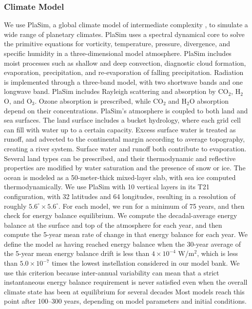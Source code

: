\documentclass[fleqn,usenatbib]{mnras}
\begin{document}
\subsubsection{Climate Model}
We use PlaSim, a global climate model of intermediate complexity \citep{Fraedrich2005}, to simulate a wide range of planetary climates. PlaSim uses a spectral dynamical core to solve the primitive equations for vorticity, temperature, pressure, divergence, and specific humidity in a three-dimensional model atmosphere. PlaSim includes moist processes such as shallow and deep convection, diagnostic cloud formation, evaporation, precipitation, and re-evaporation of falling precipitation. Radiation is implemented through a three-band model, with two shortwave bands and one longwave band. PlaSim includes Rayleigh scattering and absorption by CO$_2$, H$_2$O, and O$_3$. Ozone absorption is prescribed, while CO$_2$ and H$_2$O absorption depend on their concentrations. PlaSim's atmosphere is coupled to both land and sea surfaces. The land surface includes a bucket hydrology, where each grid cell can fill with water up to a certain capacity. Excess surface water is treated as runoff, and advected to the continental margin according to average topography, creating a river system. Surface water and runoff both contribute to evaporation. Several land types can be prescribed, and their thermodynamic and reflective properties are modified by water saturation and the presence of snow or ice. The ocean is modeled as a 50-meter-thick mixed-layer slab, with sea ice computed thermodynamically. We use PlaSim with 10 vertical layers in its T21 configuration, with 32 latitudes and 64 longitudes, resulting in a resolution of roughly $5.6^\circ\times5.6^\circ$. For each model, we run for a minimum of 75 years, and then check for energy balance equilibrium. We compute the decadal-average energy balance at the surface and top of the atmosphere for each year, and then compute the 5-year mean rate of change in that energy balance for each year. We define the model as having reached energy balance when the 30-year average of the 5-year mean energy balance drift is less than $4\times10^{-4}$ W/m$^2$, which is less than $5.0\times10^{-7}$ times the lowest instellation considered in our model bank. We use this criterion because inter-annual variability can mean that a strict instantaneous energy balance requirement is never satisfied even when the overall climate state has been at equilibrium for several decades Most models reach this point after 100--300 years, depending on model parameters and initial conditions.
\end{document}
